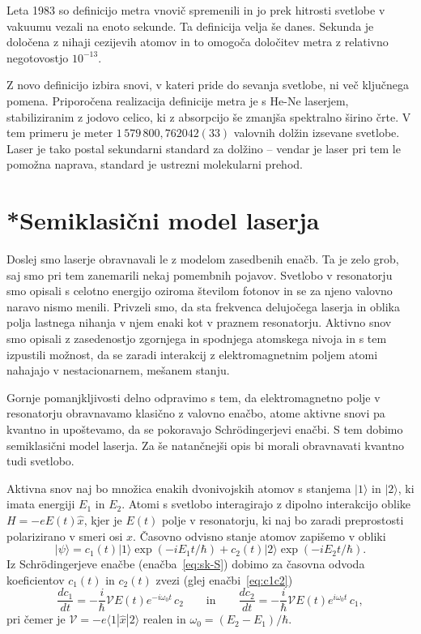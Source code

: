 Leta 1983 so definicijo metra vnovič spremenili in jo prek hitrosti svetlobe v
vakuumu vezali na enoto sekunde. Ta definicija velja še danes. Sekunda je določena
z nihaji cezijevih atomov in to omogoča določitev metra z relativno 
negotovostjo $10^{-13}$. 

Z novo definicijo izbira snovi, v kateri pride do sevanja svetlobe, ni več ključnega
pomena. Priporočena realizacija definicije metra je s He-Ne laserjem, 
stabiliziranim z jodovo celico, ki z absorpcijo še zmanjša spektralno širino črte.
V tem primeru je meter $1\,579\,800,762042(33)$ valovnih dolžin izsevane svetlobe. 
Laser je tako postal sekundarni standard za dolžino -- vendar je laser pri tem le pomožna 
naprava, standard je ustrezni molekularni prehod. 

\section{*Semiklasični model laserja}
\label{chap:semiklasicni}
Doslej smo laserje obravnavali le z modelom zasedbenih enačb. Ta je zelo
grob, saj smo pri tem zanemarili nekaj pomembnih pojavov. Svetlobo v 
resonatorju smo opisali s celotno energijo oziroma številom fotonov in se za
njeno valovno naravo nismo menili. Privzeli smo, da sta frekvenca
delujočega laserja in oblika polja lastnega nihanja v njem enaki kot v
praznem resonatorju. Aktivno snov smo opisali z zasedenostjo zgornjega
in spodnjega atomskega nivoja in s tem izpustili možnost, da se zaradi
interakcij z elektromagnetnim poljem atomi nahajajo v nestacionarnem,
mešanem stanju.

Gornje pomanjkljivosti delno odpravimo s tem, da elektromagnetno polje v
resonatorju obravnavamo klasično z valovno enačbo, atome aktivne snovi pa
kvantno in upoštevamo, da se pokoravajo Schr\"odingerjevi enačbi. S tem dobimo 
semiklasični model laserja. Za še natančnejši opis bi morali obravnavati
kvantno tudi svetlobo.

Aktivna snov naj bo množica enakih dvonivojskih 
atomov s stanjema $|1\rangle$ in $|2\rangle$, ki imata energiji $E_1$ in $E_2$.
Atomi s svetlobo interagirajo z dipolno interakcijo oblike $H = -eE(t)\hat{x}$, 
kjer je $E(t)$ polje v resonatorju, ki naj bo zaradi preprostosti 
polarizirano v smeri osi $x$. Časovno odvisno stanje atomov
zapišemo v obliki 
\begin{equation}  \label{5.45}
|\psi\rangle=c_1(t)|1\rangle\exp(-iE_1t/\hbar)+
c_2(t)|2\rangle\exp(-iE_2t/\hbar).
\end{equation}
Iz Schr\"odingerjeve enačbe (enačba~\ref{eq:sk-S}) dobimo za časovna odvoda
koeficientov $c_1(t)$ in $c_2(t)$ zvezi
(glej enačbi~\ref{eq:c1c2})
\begin{equation}
\frac{d c_1}{dt}=-\frac{i}{\hbar} \mathcal{V} E(t) e^{-i\omega_0 t}\, c_2 
\qquad \mathrm{in} \qquad
\frac{d c_2}{dt}=-\frac{i}{\hbar} \mathcal{V} E(t) e^{i\omega_0 t}\, c_1,
\label{5.46}
\end{equation}
pri čemer je $\mathcal{V} = -e\langle1|\hat{x}|2\rangle$ realen in $\omega_0=(E_2-E_1)/\hbar$.

